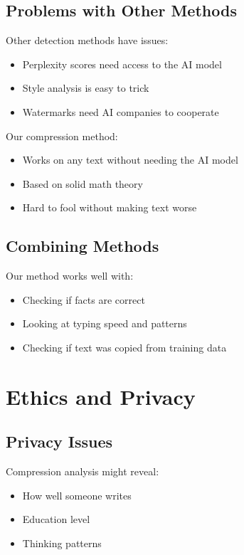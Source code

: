 \documentclass[12pt,a4paper]{report}
\begin{document}
\subsection{Problems with Other Methods}

Other detection methods have issues:
\begin{itemize}
    \item Perplexity scores need access to the AI model
    \item Style analysis is easy to trick
    \item Watermarks need AI companies to cooperate
\end{itemize}

Our compression method:
\begin{itemize}
    \item Works on any text without needing the AI model
    \item Based on solid math theory
    \item Hard to fool without making text worse
\end{itemize}

\subsection{Combining Methods}

Our method works well with:
\begin{itemize}
    \item Checking if facts are correct
    \item Looking at typing speed and patterns
    \item Checking if text was copied from training data
\end{itemize}

\section{Ethics and Privacy}

\subsection{Privacy Issues}

Compression analysis might reveal:
\begin{itemize}
    \item How well someone writes
    \item Education level
    \item Thinking patterns
\end{itemize}
\end{document}
